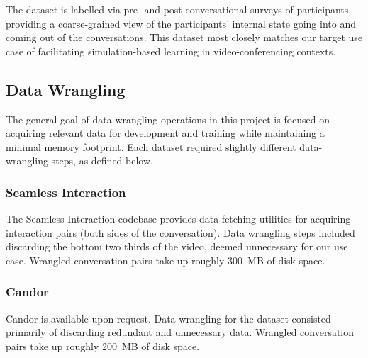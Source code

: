 \documentclass[12pt, a4paper]{article}
\begin{document}
The dataset is labelled via pre- and post-conversational surveys of participants, providing a coarse-grained view of the participants' internal state going into and coming out of the conversations. This dataset most closely matches our target use case of facilitating simulation-based learning in video-conferencing contexts.

\subsection{Data Wrangling}

The general goal of data wrangling operations in this project is focused on acquiring relevant data for development and training while maintaining a minimal memory footprint. Each dataset required slightly different data-wrangling steps, as defined below.

\subsubsection{Seamless Interaction}

The Seamless Interaction codebase provides data-fetching utilities for acquiring interaction pairs (both sides of the conversation). Data wrangling steps included discarding the bottom two thirds of the video, deemed unnecessary for our use case. Wrangled conversation pairs take up roughly 300~MB of disk space.

\subsubsection{Candor}

Candor is available upon request. Data wrangling for the dataset consisted primarily of discarding redundant and unnecessary data. Wrangled conversation pairs take up roughly 200~MB of disk space.
\end{document}
